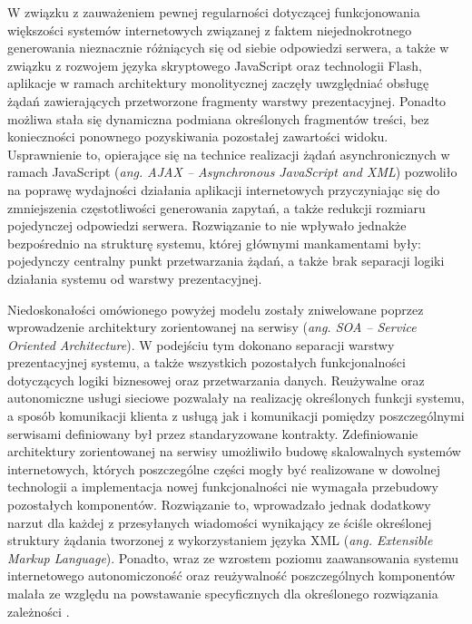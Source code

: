 W związku z zauważeniem pewnej regularności dotyczącej funkcjonowania większości systemów internetowych związanej z faktem niejednokrotnego generowania nieznacznie różniących się od siebie odpowiedzi serwera, a także w związku z rozwojem języka skryptowego JavaScript oraz technologii Flash, aplikacje w ramach architektury monolitycznej zaczęły uwzględniać obsługę żądań zawierających przetworzone fragmenty warstwy prezentacyjnej. Ponadto możliwa stała się dynamiczna podmiana określonych fragmentów treści, bez konieczności ponownego pozyskiwania pozostałej zawartości widoku. Usprawnienie to, opierające się na technice realizacji żądań asynchronicznych w ramach JavaScript (\textit{ang. AJAX -- Asynchronous JavaScript and XML}) pozwoliło na poprawę wydajności działania aplikacji internetowych przyczyniając się do zmniejszenia częstotliwości generowania zapytań, a także redukcji rozmiaru pojedynczej odpowiedzi serwera. Rozwiązanie to nie wpływało jednakże bezpośrednio na strukturę systemu, której głównymi mankamentami były: pojedynczy centralny punkt przetwarzania żądań, a także brak separacji logiki działania systemu od warstwy prezentacyjnej.

Niedoskonałości omówionego powyżej modelu zostały zniwelowane poprzez wprowadzenie architektury zorientowanej na serwisy (\textit{ang. SOA -- Service Oriented Architecture}). W podejściu tym dokonano separacji warstwy prezentacyjnej systemu, a także wszystkich pozostałych funkcjonalności dotyczących logiki biznesowej oraz przetwarzania danych. Reużywalne oraz autonomiczne usługi sieciowe pozwalały na realizację określonych funkcji systemu, a sposób komunikacji klienta z usługą jak i komunikacji pomiędzy poszczególnymi serwisami definiowany był przez standaryzowane kontrakty. Zdefiniowanie architektury zorientowanej na serwisy umożliwiło budowę skalowalnych systemów internetowych, których poszczególne części mogły być realizowane w dowolnej technologii a implementacja nowej funkcjonalności nie wymagała przebudowy pozostałych komponentów. Rozwiązanie to, wprowadzało jednak dodatkowy narzut dla każdej z przesyłanych wiadomości wynikający ze ściśle określonej struktury żądania tworzonej z wykorzystaniem języka XML (\textit{ang. Extensible Markup Language}). Ponadto, wraz ze wzrostem poziomu zaawansowania systemu internetowego autonomiczoność oraz reużywalność poszczególnych komponentów malała ze względu na powstawanie specyficznych dla określonego rozwiązania zależności \cite{WANG2004309}.

